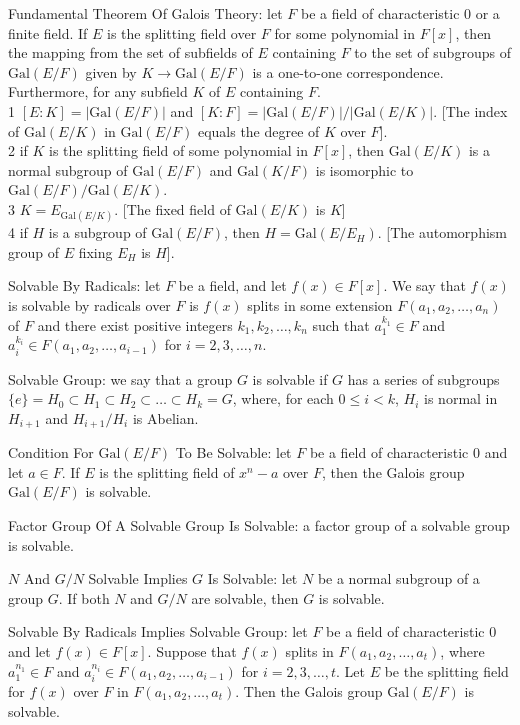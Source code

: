 Fundamental Theorem Of Galois Theory: let $F$ be a field of characteristic $0$ or a finite field. If $E$ is the splitting field over $F$ for some polynomial in $F[x]$, then the mapping from the set of subfields of $E$ containing $F$ to the set of subgroups of $\text{Gal}(E/F)$ given by $K \to \text{Gal}(E/F)$ is a one-to-one correspondence. Furthermore, for any subfield $K$ of $E$ containing $F$. \\
1 $[E:K]=|\text{Gal}(E/F)|$ and $[K:F]=|\text{Gal}(E/F)|/|\text{Gal}(E/K)|$. [The index of $\text{Gal}(E/K)$ in $\text{Gal}(E/F)$ equals the degree of $K$ over $F$]. \\
2 if $K$ is the splitting field of some polynomial in $F[x]$, then $\text{Gal}(E/K)$ is a normal subgroup of $\text{Gal}(E/F)$ and $\text{Gal}(K/F)$ is isomorphic to $\text{Gal}(E/F)/\text{Gal}(E/K)$. \\
3 $K=E_{\text{Gal}(E/K)}$. [The fixed field of $\text{Gal}(E/K)$ is $K$] \\
4 if $H$ is a subgroup of $\text{Gal}(E/F)$, then $H=\text{Gal}(E/E_H)$. [The automorphism group of $E$ fixing $E_H$ is $H$].

Solvable By Radicals: let $F$ be a field, and let $f(x) \in F[x]$. We say that $f(x)$ is solvable by radicals over $F$ is $f(x)$ splits in some extension $F(a_1,a_2,\dots,a_n)$ of $F$ and there exist positive integers $k_1,k_2,\dots,k_n$ such that $a_1^{k_1} \in F$ and $a_i^{k_i} \in F(a_1,a_2,\dots,a_{i-1})$ for $i=2,3,\dots,n$.

Solvable Group: we say that a group $G$ is solvable if $G$ has a series of subgroups $\{ e \} = H_0 \subset H_1 \subset H_2 \subset \dots \subset H_k = G$, where, for each $0\le i < k$, $H_i$ is normal in $H_{i+1}$ and $H_{i+1}/H_i$ is Abelian.

Condition For $\text{Gal}(E/F)$ To Be Solvable: let $F$ be a field of characteristic $0$ and let $a \in F$. If $E$ is the splitting field of $x^n-a$ over $F$, then the Galois group $\text{Gal}(E/F)$ is solvable.

Factor Group Of A Solvable Group Is Solvable: a factor group of a solvable group is solvable.

$N$ And $G/N$ Solvable Implies $G$ Is Solvable: let $N$ be a normal subgroup of a group $G$. If both $N$ and $G/N$ are solvable, then $G$ is solvable.

Solvable By Radicals Implies Solvable Group: let $F$ be a field of characteristic $0$ and let $f(x) \in F[x]$. Suppose that $f(x)$ splits in $F(a_1,a_2,\dots,a_t)$, where $a_1^{n_1} \in F$ and $a_i^{n_i} \in F(a_1,a_2,\dots,a_{i-1})$ for $i=2,3,\dots,t$. Let $E$ be the splitting field for $f(x)$ over $F$ in $F(a_1,a_2,\dots,a_t)$. Then the Galois group $\text{Gal}(E/F)$ is solvable.

